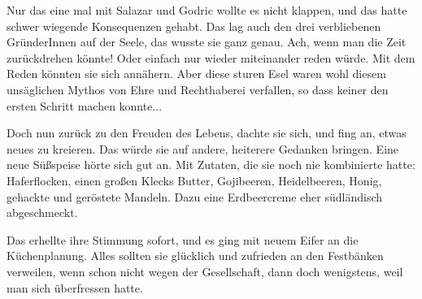 \documentclass[fontsize=12pt]{scrartcl}
\begin{document}
	Nur das eine mal mit Salazar und Godric wollte es nicht klappen, und das hatte schwer wiegende Konsequenzen gehabt. Das lag auch den drei verbliebenen GründerInnen auf der Seele, das wusste sie ganz genau. Ach, wenn man die Zeit zurückdrehen könnte! Oder einfach nur wieder miteinander reden würde. Mit dem Reden könnten sie sich annähern. Aber diese sturen Esel waren wohl diesem unsäglichen Mythos von Ehre und Rechthaberei verfallen, so dass keiner den ersten Schritt machen konnte... 
	
	Doch nun zurück zu den Freuden des Lebens, dachte sie sich, und fing an, etwas neues zu kreieren. Das würde sie auf andere, heiterere Gedanken bringen. Eine neue Süßspeise hörte sich gut an. Mit Zutaten, die sie noch nie kombinierte hatte: Haferflocken, einen großen Klecks Butter, Gojibeeren, Heidelbeeren, Honig, gehackte und geröstete Mandeln. Dazu eine Erdbeercreme eher südländisch abgeschmeckt. 
	
	Das erhellte ihre Stimmung sofort, und es ging mit neuem Eifer an die Küchenplanung. Alles sollten sie glücklich und zufrieden an den Festbänken verweilen, wenn schon nicht wegen der Gesellschaft, dann doch wenigstens, weil man sich überfressen hatte.
	
\end{document}
